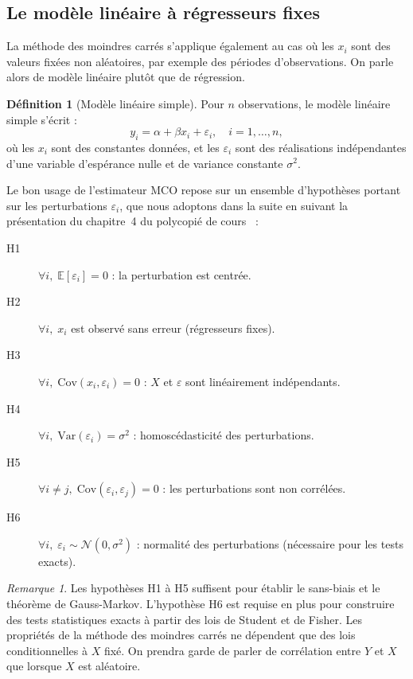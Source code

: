 \documentclass[12pt,a4paper]{article}
\theoremstyle{definition}
\newtheorem{definition}[theoreme]{Définition}
\theoremstyle{remark}
\newtheorem{remarque}[theoreme]{Remarque}
\newcommand{\Esp}{\mathbb{E}}
\newcommand{\Var}{\mathrm{Var}}
\newcommand{\Cov}{\mathrm{Cov}}
\begin{document}
\subsection{Le modèle linéaire à régresseurs fixes}


La méthode des moindres carrés s'applique également au cas où les $x_i$ sont des
valeurs fixées non aléatoires, par exemple des périodes d'observations. On parle alors de modèle linéaire plutôt que de régression.

\begin{definition}[Modèle linéaire simple]
\label{def:modlin}
Pour $n$ observations, le modèle linéaire simple s'écrit :
\begin{equation}
  \label{eq:modlin}
  y_i = \alpha + \beta x_i + \varepsilon_i, \quad i = 1, \ldots, n,
\end{equation}
où les $x_i$ sont des constantes données, et les $\varepsilon_i$ sont des
réalisations indépendantes d'une variable d'espérance nulle et de variance
constante $\sigma^2$.
\end{definition}

\noindent Le bon usage de l'estimateur MCO repose sur un ensemble d'hypothèses
portant sur les perturbations $\varepsilon_i$, que nous adoptons dans la suite
en suivant la présentation du chapitre~4 du polycopié de cours~\cite{poly2024} :

\begin{description}
  \item[H1] $\forall i,\; \Esp[\varepsilon_i] = 0$ : la perturbation est centrée.
  \item[H2] $\forall i,\; x_i$ est observé sans erreur (régresseurs fixes).
  \item[H3] $\forall i,\; \Cov(x_i, \varepsilon_i) = 0$ : $X$ et $\varepsilon$ sont
            linéairement indépendants.
  \item[H4] $\forall i,\; \Var(\varepsilon_i) = \sigma^2$ : homoscédasticité des
            perturbations.
  \item[H5] $\forall i \neq j,\; \Cov(\varepsilon_i, \varepsilon_j) = 0$ : les
            perturbations sont non corrélées.
  \item[H6] $\forall i,\; \varepsilon_i \sim \mathcal{N}(0, \sigma^2)$ : normalité
            des perturbations (nécessaire pour les tests exacts).
\end{description}

\begin{remarque}
Les hypothèses H1 à H5 suffisent pour établir le sans-biais et le théorème de
Gauss-Markov. L'hypothèse H6 est requise en plus pour construire des tests
statistiques exacts à partir des lois de Student et de Fisher.
Les propriétés de la méthode des moindres carrés ne dépendent que des lois
conditionnelles à $X$ fixé. On prendra garde de parler de corrélation entre
$Y$ et $X$ que lorsque $X$ est aléatoire.
\end{remarque}
\end{document}
